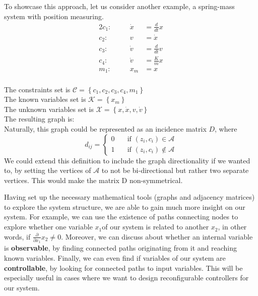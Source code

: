 To showcase this approach, let us consider another example, a spring-mass system with position measuring.
\begin{alignat*}{2}
c_1: &\quad& \dot{x} &= \frac{d}{dt}x \\
c_2: &\quad& v &= \dot{x} \\
c_3: &\quad& \dot{v} &= \frac{d}{dt}v\\
c_4: &\quad& \dot{v} &= \frac{K}{m}x\\
m_1: &\quad& x_m &= x\\
\end{alignat*}

The constraints set is $\mathcal{C}=\left\{c_1, c_2, c_3, c_4, m_1\right\}$\\
The known variables set is $\mathcal{K}=\left\{x_m\right\}$\\
The unknown variables set is $\mathcal{X}= \left\{x, \dot{x}, v, \dot{v}\right\}$\\
The resulting graph is: \\


Naturally, this graph could be represented as an incidence matrix $D$, where $$
d_{ij} = \left\{\begin{array} {rl}
0 \quad &\text{if }(z_i, c_i)\in\mathcal{A} \\
1 \quad &\text{if }(z_i, c_i)\notin\mathcal{A} 
\end{array}\right.
$$
We could extend this definition to include the graph directionality if we wanted to, by setting the vertices of $\mathcal{A}$ to not be bi-directional but rather two separate vertices. This would make the matrix D non-symmetrical.

Having set up the necessary mathematical tools (graphs and adjacency matrices) to explore the system structure, we are able to gain much more insight on our system. For example, we can use the existence of paths connecting nodes to explore whether one variable $ x_1$of our system is related to another $x_2$, in other words, if $\frac{\partial}{\partial x_1}x_2 \neq 0$.
Moreover, we can discuss about whether an internal variable is \textbf{observable}, by finding connected paths originating from it and reaching known variables. Finally, we can even find if variables of our system are \textbf{controllable}, by looking for connected paths to input variables. This will be especially useful in cases where we want to design reconfigurable controllers for our system.